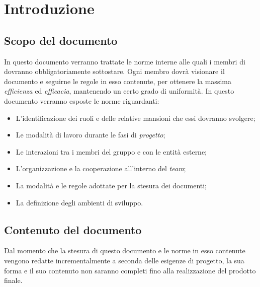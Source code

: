 \newpage
\section{Introduzione}

\subsection{Scopo del documento}
In questo documento verranno trattate le norme interne alle quali i membri di \gruppo{} dovranno obbligatoriamente sottostare. Ogni membro dovrà visionare il documento e seguirne le regole in esso contenute, per ottenere la massima \emph{efficienza} ed \emph{efficacia}, mantenendo un certo grado di uniformità.
\newline In questo documento verranno esposte le norme riguardanti:
\begin{itemize}
	\item L'identificazione dei ruoli e delle relative mansioni che essi dovranno svolgere;
	\item Le modalità di lavoro durante le fasi di \emph{progetto};
	\item Le interazioni tra i membri del gruppo e con le entità esterne;
	\item L'organizzazione e la cooperazione all'interno del \emph{team};
	\item La modalità e le regole adottate per la stesura dei documenti;
	\item La definizione degli ambienti di sviluppo.
\end{itemize}

\subsection{Contenuto del documento}
Dal momento che la stesura di questo documento e le norme in esso contenute vengono redatte incrementalmente a seconda delle esigenze di progetto, la sua forma e il suo contenuto non saranno completi fino alla realizzazione del prodotto finale.
